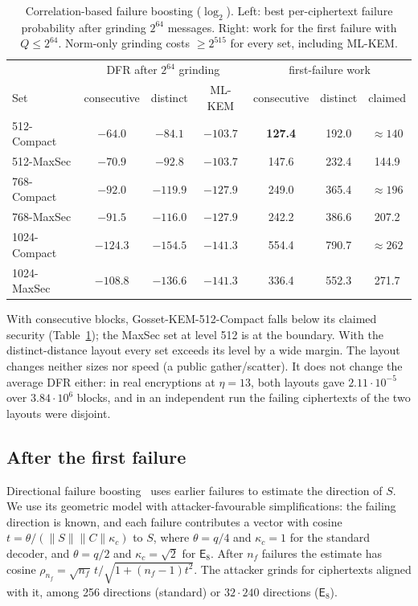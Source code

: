 \documentclass[11pt,a4paper]{article}
\theoremstyle{definition}
\theoremstyle{remark}
\newcommand{\E}{\mathsf{E}_8}
\newcommand{\lt}{\log_2}
\begin{document}
\begin{table}[t]\centering\small
\caption{Correlation-based failure boosting ($\lt$). Left: best per-ciphertext failure probability after grinding $2^{64}$ messages. Right: work for the first failure with $Q\le2^{64}$. Norm-only grinding costs $\ge2^{515}$ for every set, including ML-KEM.}\label{tab:attack}
\begin{tabular}{lccc|ccc}\toprule
& \multicolumn{3}{c|}{DFR after $2^{64}$ grinding} & \multicolumn{3}{c}{first-failure work}\\
Set & consecutive & distinct & ML-KEM & consecutive & distinct & claimed\\\midrule
512-Compact & $-64.0$ & $-84.1$ & $-103.7$ & \textbf{127.4} & 192.0 & $\approx140$\\
512-MaxSec & $-70.9$ & $-92.8$ & $-103.7$ & 147.6 & 232.4 & 144.9\\
768-Compact & $-92.0$ & $-119.9$ & $-127.9$ & 249.0 & 365.4 & $\approx196$\\
768-MaxSec & $-91.5$ & $-116.0$ & $-127.9$ & 242.2 & 386.6 & 207.2\\
1024-Compact & $-124.3$ & $-154.5$ & $-141.3$ & 554.4 & 790.7 & $\approx262$\\
1024-MaxSec & $-108.8$ & $-136.6$ & $-141.3$ & 336.4 & 552.3 & 271.7\\\bottomrule
\end{tabular}
\end{table}

With consecutive blocks, Gosset-KEM-512-Compact falls below its claimed security (Table~\ref{tab:attack}); the MaxSec set at level 512 is at the boundary. With the distinct-distance layout every set exceeds its level by a wide margin. The layout changes neither sizes nor speed (a public gather/scatter). It does not change the average DFR either: in real encryptions at $\eta=13$, both layouts gave $2.11\cdot10^{-5}$ over $3.84\cdot10^6$ blocks, and in an independent run the failing ciphertexts of the two layouts were disjoint.

\subsection{After the first failure}
Directional failure boosting~\cite{danvers20} uses earlier failures to estimate the direction of $S$. We use its geometric model with attacker-favourable simplifications: the failing direction is known, and each failure contributes a vector with cosine $t=\theta/(\|S\|\|C\|\kappa_c)$ to $S$, where $\theta=q/4$ and $\kappa_c=1$ for the standard decoder, and $\theta=q/2$ and $\kappa_c=\sqrt2$ for $\E$. After $n_f$ failures the estimate has cosine $\rho_{n_f}=\sqrt{n_f}\,t/\sqrt{1+(n_f-1)t^2}$. The attacker grinds for ciphertexts aligned with it, among 256 directions (standard) or $32\cdot240$ directions ($\E$).
\end{document}
